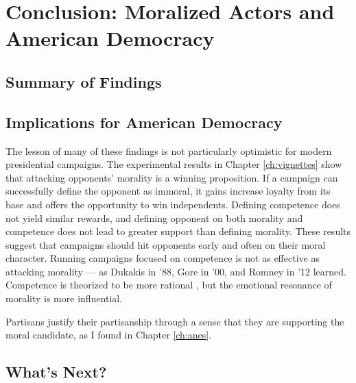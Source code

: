 \chapter{Conclusion: Moralized Actors and American Democracy}

\section{Summary of Findings}

\section{Implications for American Democracy}
The lesson of many of these findings is not particularly optimistic for modern presidential campaigns. The experimental results in Chapter \ref{ch:vignettes} show that attacking opponents' morality is a winning proposition. If a campaign can successfully define the opponent as immoral, it gains increase loyalty from its base and offers the opportunity to win independents. Defining competence does not yield similar rewards, and defining opponent on both morality and competence does not lead to greater support than defining morality. These results suggest that campaigns should hit opponents early and often on their moral character. Running campaigns focused on competence is not as effective as attacking morality --- as Dukakis in '88, Gore in '00, and Romney in '12 learned. Competence is theorized to be more rational \cite{Popkin1991}, but the emotional resonance of morality is more influential. 

Partisans justify their partisanship through a sense that they are supporting the moral candidate, as I found in Chapter \ref{ch:anes}.

\section{What's Next?} 